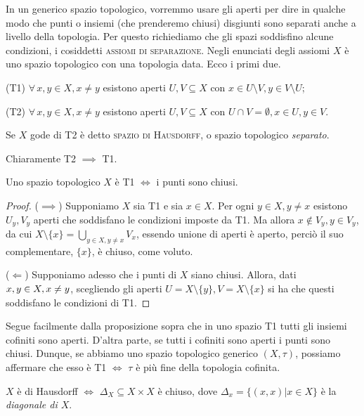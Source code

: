In un generico spazio topologico, vorremmo usare gli aperti per dire in qualche modo che punti o insiemi (che prenderemo chiusi) disgiunti sono separati anche a livello della topologia. Per questo richiediamo che gli spazi soddisfino alcune condizioni, i cosiddetti \textsc{assiomi di separazione}. Negli enunciati degli assiomi $X$ è uno spazio topologico con una topologia data. Ecco i primi due.

(T1) $\forall \, x, y \in X, x \not=y$ esistono aperti $U, V \subseteq X$ con $x \in U \setminus V, y \in V \setminus U$;

(T2) $\forall \, x, y \in X, x \not=y$ esistono aperti $U, V \subseteq X$ con $U \cap V= \emptyset, x \in U, y \in V$.

\begin{defn} Se $X$ gode di T2 è detto \textsc{spazio di Hausdorff}, o spazio topologico \textit{separato}.
\end{defn}

Chiaramente T2 $\implies$ T1.

\begin{prop}
  Uno spazio topologico $X$ è T1 $\Leftrightarrow$ i punti sono chiusi.
\end{prop}

\begin{proof}
  ($\implies$) Supponiamo $X$ sia T1 e sia $x \in X$. Per ogni $y \in X, y \not=x$ esistono $U_y, V_y$ aperti che soddisfano le condizioni imposte da T1. Ma allora $x \not \in V_y, y \in V_y$, da cui $\displaystyle X \setminus \{x\}=\bigcup_{y \in X, y \not=x} V_x$, essendo unione di aperti è aperto, perciò il suo complementare, $\{x\}$, è chiuso, come voluto.

  ($\Leftarrow$) Supponiamo adesso che i punti di $X$ siano chiusi. Allora, dati $x, y \in X, \\ x \not= y$, scegliendo gli aperti $U=X \setminus \{y\}, V=X \setminus \{x\}$ si ha che questi soddisfano le condizioni di T1.
\end{proof}

\begin{oss}
  Segue facilmente dalla proposizione sopra che in uno spazio T1 tutti gli insiemi cofiniti sono aperti. D'altra parte, se tutti i cofiniti sono aperti i punti sono chiusi. Dunque, se abbiamo uno spazio topologico generico $(X, \tau)$, possiamo affermare che esso è T1 $\Leftrightarrow$ $\tau$ è più fine della topologia cofinita.
\end{oss}

\begin{prop}
  $X$ è di Hausdorff $\Leftrightarrow$ $\Delta_X \subseteq X \times X$ è chiuso, dove $\Delta_x=\{ (x, x) | x \in X \}$ è la \textit{diagonale di $X$}.
\end{prop}

